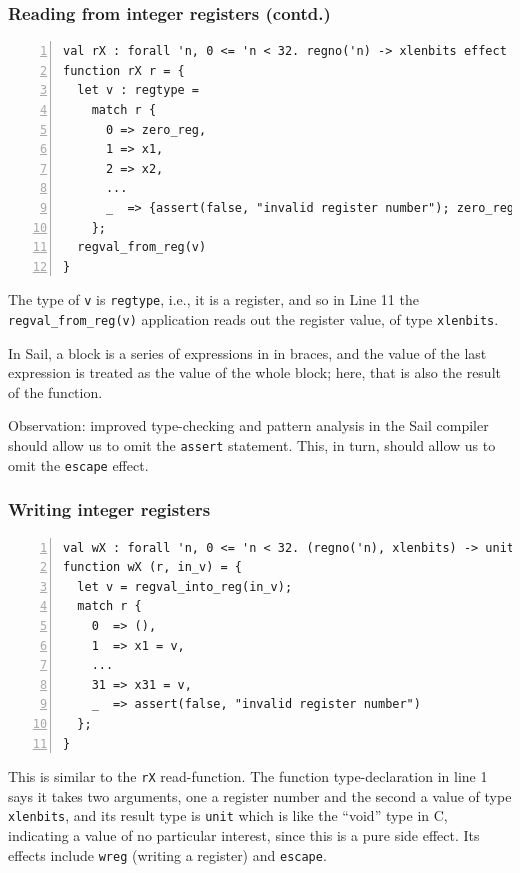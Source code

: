 \documentclass[aspectratio=169]{beamer}
\newcommand{\slidefont}{\scriptsize}
\newcommand{\cf}{\scriptsize\tt}
\begin{document}

\begin{frame}[fragile]
  \frametitle{Reading from integer registers (contd.)}

  \slidefont

  \begin{Verbatim}[frame=single, numbers=left, label = File riscv\_regs.sail]
val rX : forall 'n, 0 <= 'n < 32. regno('n) -> xlenbits effect {rreg, escape}
function rX r = {
  let v : regtype =
    match r {
      0 => zero_reg,
      1 => x1,
      2 => x2,
      ...
      _  => {assert(false, "invalid register number"); zero_reg}
    };
  regval_from_reg(v)
}
  \end{Verbatim}

  \begin{minipage}{\textwidth}
    The type of {\cf v} is {\cf regtype}, i.e., it is a register, and
    so in Line 11 the {\cf regval\_from\_reg(v)} application reads out
    the register value, of type {\cf xlenbits}.

    \vspace{1ex}

    In Sail, a block is a series of expressions in in braces, and the
    value of the last expression is treated as the value of the whole
    block; here, that is also the result of the function.

    \vspace{1ex}

    Observation: improved type-checking and pattern analysis in the
    Sail compiler should allow us to omit the {\cf assert} statement.
    This, in turn, should allow us to omit the {\cf escape} effect.
  \end{minipage}

\end{frame}


\begin{frame}[fragile]
  \frametitle{Writing integer registers}

  \slidefont

  \begin{Verbatim}[frame=single, numbers=left, label = File riscv\_regs.sail]
val wX : forall 'n, 0 <= 'n < 32. (regno('n), xlenbits) -> unit effect {wreg, escape}
function wX (r, in_v) = {
  let v = regval_into_reg(in_v);
  match r {
    0  => (),
    1  => x1 = v,
    ...
    31 => x31 = v,
    _  => assert(false, "invalid register number")
  };
}
  \end{Verbatim}

  \begin{minipage}{\textwidth}
    This is similar to the {\cf rX} read-function.  The function
    type-declaration in line 1 says it takes two arguments, one a
    register number and the second a value of type {\cf xlenbits}, and
    its result type is {\cf unit} which is like the ``void'' type in
    C, indicating a value of no particular interest, since this is a
    pure side effect.  Its effects include {\cf wreg} (writing a
    register) and {\cf escape}.
  \end{minipage}

\end{frame}
\end{document}
